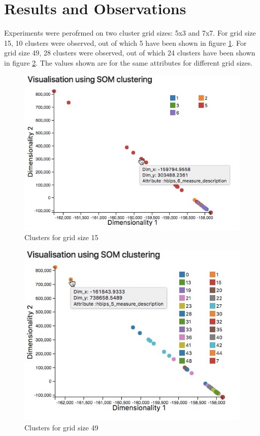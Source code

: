 \documentclass[conference]{IEEEtran}
\begin{document}
\section{Results and Observations}
Experiments were perofrmed on two cluster grid sizes: 5x3 and 7x7. For grid size 15, 10 clusters were observed, out of which 5 have been shown in figure \ref{15}. For grid size 49, 28 clusters were observed, out of which 24 clusters have been shown in figure \ref{49}. The values shown are for the same attributes for different grid sizes. 

\begin{figure}[h]
\centering
\includegraphics[scale=0.4]{grid_15.jpeg}
\caption{Clusters for grid size 15}
\label{15}
\end{figure}

\begin{figure}[h]
\centering
\includegraphics[scale=0.4]{grid_49.jpeg}
\caption{Clusters for grid size 49}
\label{49}
\end{figure}
\end{document}
